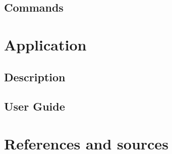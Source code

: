 \documentclass[12pt, a4paper]{article}
\begin{document}
\blindtext

\subsection{Commands}

\blindtext

\clearpage

\section{Application}

\subsection{Description}

\blindtext

\subsection{User Guide}

\blindtext

\clearpage

\section{References and sources}

\blindtext

\clearpage
\end{document}

